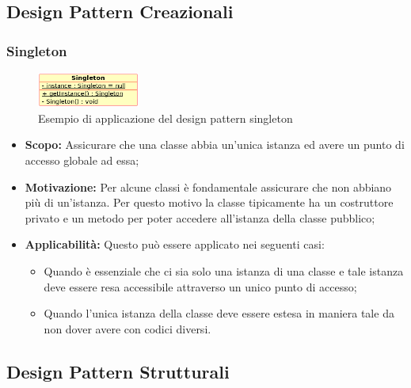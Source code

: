 \documentclass{scalatekids-article}
\begin{document}
\subsection{Design Pattern Creazionali}

\subsubsection{Singleton}

\begin{figure}[H]
  \begin{center}
    \includegraphics[width=0.3\textwidth, keepaspectratio]{img/designPattern/Singleton.png}
    \caption{Esempio di applicazione del design pattern singleton}
  \end{center}
\end{figure}

\begin{itemize}

\item \textbf{Scopo:} Assicurare che una classe abbia un'unica istanza ed avere
  un punto di accesso globale ad essa;

\item \textbf{Motivazione:} Per alcune classi è fondamentale assicurare che non
  abbiano più di un'istanza. Per questo motivo la classe tipicamente ha un
  costruttore privato e un metodo per poter accedere all'istanza della classe
  pubblico;

\item \textbf{Applicabilità:} Questo  può essere
  applicato nei seguenti casi:
  \begin{itemize}
  \item Quando è essenziale che ci sia solo una istanza di una classe e tale
    istanza deve essere resa accessibile attraverso un unico punto di accesso;
  \item Quando l'unica istanza della classe deve essere estesa in maniera
    tale da non dover avere  con codici diversi.
  \end{itemize}

\end{itemize}

\subsection{Design Pattern Strutturali}
\end{document}
